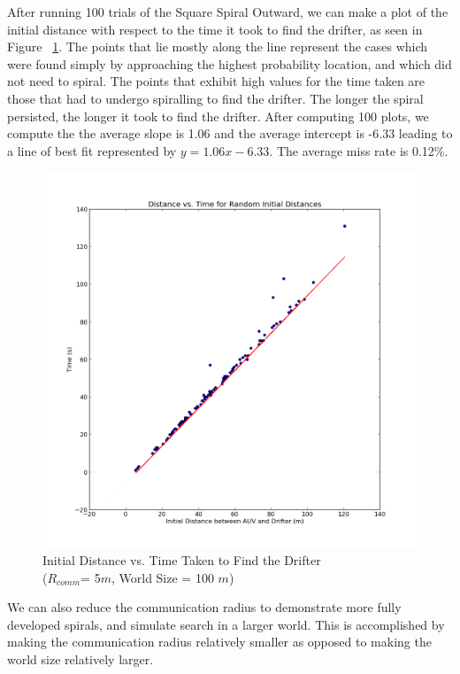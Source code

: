 \documentclass[a4paper, 11pt]{article} %
\begin{document}
\noindent After running 100 trials of the Square Spiral Outward, we can make a plot of the initial distance with respect to the time it took to find the drifter, as seen in Figure ~\ref{distanceVTime5}. The points that lie mostly along the line represent the cases which were found simply by approaching the highest probability location, and which did not need to spiral. The points that exhibit high values for the time taken are those that had to undergo spiralling to find the drifter. The longer the spiral persisted, the longer it took to find the drifter. After computing 100 plots, we compute the the average slope is 1.06 and the average intercept is -6.33 leading to a line of best fit represented by $y= 1.06x - 6.33$. The average miss rate is 0.12\%.\\

\begin{figure}[H]

	\begin{center}
		\includegraphics[scale=0.30]{distance_calculation_rcomm5.png}
	\end{center}
\caption{Initial Distance vs. Time Taken to Find the Drifter\\ ($R_{comm}$= 5$m$, World Size = 100 $m$) \label{distanceVTime5}}
\end{figure}

\noindent We can also reduce the communication radius to demonstrate more fully developed spirals, and simulate search in a larger world. This is accomplished by making the communication radius relatively smaller as opposed to making the world size relatively larger. \\
\end{document}
